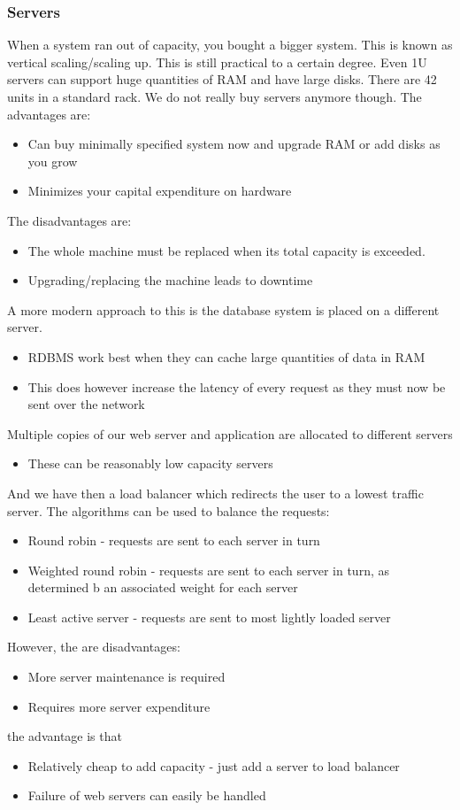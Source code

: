 \documentclass[a4paper]{article}
\theoremstyle{plain}
\theoremstyle{definition}
\theoremstyle{remark}
\begin{document}
\begin{flushleft}
\subsubsection{Servers}
When a system ran out of capacity, you bought a bigger system. This is known as vertical scaling/scaling up. This is still practical to a certain degree. Even 1U servers can support huge quantities of RAM and have large disks. There are 42 units in a standard rack. We do not really buy servers anymore though. The advantages are:
\begin{itemize}
	\item Can buy minimally specified system now and upgrade RAM or add disks as you grow
	\item Minimizes your capital expenditure on hardware
\end{itemize}
The disadvantages are:
\begin{itemize}
	\item The whole machine must be replaced when its total capacity is exceeded.
	\item Upgrading/replacing the machine leads to downtime
\end{itemize}
A more modern approach to this is the database system is placed on a different server.
\begin{itemize}
	\item RDBMS work best when they can cache large quantities of data in RAM
	\item This does however increase the latency of every request as they must now be sent over the network
\end{itemize}
Multiple copies of our web server and application are allocated to different servers
\begin{itemize}
	\item These can be reasonably low capacity servers
\end{itemize}
And we have then a load balancer which redirects the user to a lowest traffic server. The algorithms can be used to balance the requests:
\begin{itemize}
	\item Round robin - requests are sent to each server in turn
	\item Weighted round robin - requests are sent to each server in turn, as determined b an associated weight for each server
	\item Least active server - requests are sent to most lightly loaded server
\end{itemize}
However, the are disadvantages:
\begin{itemize}
	\item More server maintenance is required
	\item Requires more server expenditure
\end{itemize}
the advantage is that
\begin{itemize}
	\item Relatively cheap to add capacity - just add a server to load balancer
	\item Failure of web servers can easily be handled
\end{itemize}

\end{flushleft}
\end{document}
